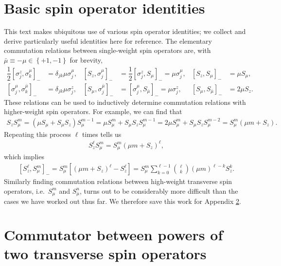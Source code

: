 \documentclass[aps,notitlepage,nofootinbib,11pt]{revtex4-1}
\newcommand{\f}[2]{\dfrac{#1}{#2}} %
\newcommand{\p}[1]{\left(#1\right)} %
\renewcommand{\sp}[1]{\left[#1\right]} %
\renewcommand{\set}[1]{\left\{#1\right\}} %
\newcommand{\bmu}{{\bar\mu}}
\newcommand{\1}{\mathds{1}}
\begin{document}


\newpage
\appendix

\section{Basic spin operator identities}
\label{sec:identities}

This text makes ubiquitous use of various spin operator identities; we
collect and derive particularly useful identities here for reference.
The elementary commutation relations between single-weight spin
operators are, with $\bmu\equiv-\mu\in\set{+1,-1}$ for brevity,
\begin{align}
  \f12 \sp{\sigma_j^z,\sigma_k^\mu}_-
  &= \delta_{jk} \mu \sigma_j^\mu,
  &
  \sp{S_z,\sigma_j^\mu}_-
  &= \f12 \sp{\sigma_j^z,S_\mu}_- = \mu \sigma_j^\mu,
  &
  \sp{S_z,S_\mu}_-
  &= \mu S_\mu,
  \label{eq:comm_z_mu_base} \\
  \sp{\sigma_j^\mu,\sigma_k^\bmu}_-
  &= \delta_{jk} \mu \sigma_j^z,
  &
  \sp{S_\mu,\sigma_j^\bmu}_-
  &= \sp{\sigma_j^\mu,S_\bmu}_- = \mu \sigma_j^z,
  &
  \sp{S_\mu,S_\bmu}_-
  &= 2 \mu S_z.
  \label{eq:comm_mu_base}
\end{align}
These relations can be used to inductively determine commutation
relations with higher-weight spin operators.  For example, we can find
that
\begin{align}
  S_z S_\mu^m
  = \p{\mu S_\mu + S_\mu S_z} S_\mu^{m-1}
  = \mu S_\mu^m + S_\mu S_z S_\mu^{m-1}
  = 2 \mu S_\mu^m + S_\mu S_z S_\mu^{m-2}
  = S_\mu^m \p{\mu m + S_z}.
  \label{eq:push_z_mu_single}
\end{align}
Repeating this process $\ell$ times tells us
\begin{align}
  S_z^\ell S_\mu^m
  = S_\mu^m \p{\mu m + S_z}^\ell,
  \label{eq:push_z_mu}
\end{align}
which implies
\begin{align}
  \sp{S_z^\ell, S_\mu^m}_-
  = S_\mu^m \sp{\p{\mu m + S_z}^\ell - S_z^\ell}
  = S_\mu^m \sum_{k=0}^{\ell-1} {\ell \choose k} \p{\mu m}^{\ell-k} S_z^k.
  \label{eq:comm_z_mu}
\end{align}
Similarly finding commutation relations between high-weight transverse
spin operators, i.e.~$S_\mu^m$ and $S_\bmu^n$, turns out to be
considerably more difficult than the cases we have worked out thus
far.  We therefore save this work for Appendix
\ref{sec:comm_transverse}.


\section{Commutator between powers of two transverse spin operators}
\label{sec:comm_transverse}
\end{document}
